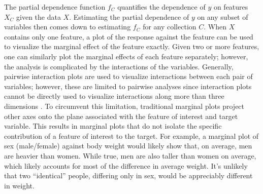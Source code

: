 \documentclass[12pt]{article}
\newcommand{\cut}[1]{}
\begin{document}
The partial dependence function $f_C$ quantifies the dependence of $y$ on features ${X}_C$ given the data $X$. Estimating the partial dependence of $y$ on any subset of variables then comes down to estimating $f_C$ for any collection $C$. When $X$ contains only one feature, a plot of the response against the feature can be used to visualize the marginal effect of the feature exactly. Given two or more features, one can similarly plot the marginal effects of each feature separately; however, the analysis is complicated by the interactions of the variables. Generally, pairwise interaction plots are used to visualize interactions between each pair of variables; however, these are limited to pairwise analyses since interaction plots cannot be directly used to visualize interactions along more than three dimensions \citep{cox2014multivariate}. To circumvent this limitation, traditional marginal plots project other axes onto the plane associated with the feature of interest and target variable. \cut{{\color{red} reference for this? Is this like PCA? it implicitly projects. just plotting $x_c$ against $y$ does this automatically}}This results in marginal plots that do not isolate the specific contribution of a feature of interest to the target. For example, a marginal plot of sex (male/female) against body weight would likely show that, on average, men are heavier than women. While true, men are also taller than women on average, which likely accounts for most of the difference in average weight. It's unlikely that two ``identical'' people, differing only in sex, would be appreciably different in weight. 
\end{document}
